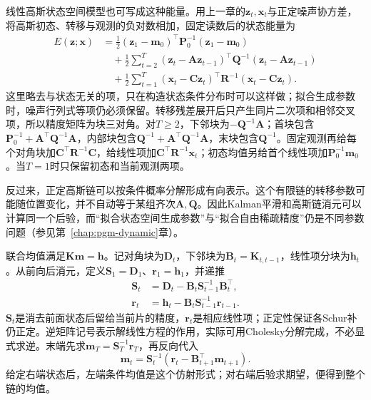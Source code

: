 线性高斯状态空间模型也可写成这种能量。用上一章的$\bm z_t,\bm x_t$与正定噪声协方差，将高斯初态、转移与观测的负对数相加，固定读数后的状态能量为
\begin{equation}
  \begin{aligned}
    E(\bm z;\bm x)
      &=\tfrac12(\bm z_1-\bm m_0)^\top\bm P_0^{-1}
                          (\bm z_1-\bm m_0)\\
      &\quad{}+\tfrac12\sum_{t=2}^{T}
        (\bm z_t-\bm A\bm z_{t-1})^\top\bm Q^{-1}
        (\bm z_t-\bm A\bm z_{t-1})\\
      &\quad{}+\tfrac12\sum_{t=1}^{T}
        (\bm x_t-\bm C\bm z_t)^\top\bm R^{-1}
        (\bm x_t-\bm C\bm z_t).
  \end{aligned}
  \label{eq:pgm-dynamic-undirected-lgssm-energy}
\end{equation}
这里略去与状态无关的项，只在构造状态条件分布时可以这样做；拟合生成参数时，噪声行列式等项仍必须保留。转移残差展开后只产生同片二次项和相邻交叉项，所以精度矩阵为块三对角。对$T\geq2$，下邻块为$-\bm Q^{-1}\bm A$；首块包含$\bm P_0^{-1}+\bm A^\top\bm Q^{-1}\bm A$，内部块包含$\bm Q^{-1}+\bm A^\top\bm Q^{-1}\bm A$，末块包含$\bm Q^{-1}$。固定观测再给每个对角块加$\bm C^\top\bm R^{-1}\bm C$，给线性项加$\bm C^\top\bm R^{-1}\bm x_t$；初态均值另给首个线性项加$\bm P_0^{-1}\bm m_0$。当$T=1$时只保留初态和当前观测两项。

反过来，正定高斯链可以按条件概率分解形成有向表示。这个有限链的转移参数可能随位置变化，并不自动等于某组齐次$\bm A,\bm Q$。因此Kalman平滑和高斯链消元可以计算同一个后验，而“拟合状态空间生成参数”与“拟合自由稀疏精度”仍是不同参数问题（参见第~\ref{chap:pgm-dynamic}章）。

联合均值满足$\bm K\bm m=\bm h$。记对角块为$\bm D_t$，下邻块为$\bm B_t=\bm K_{t,t-1}$，线性项分块为$\bm h_t$。从前向后消元，定义$\bm S_1=\bm D_1$、$\bm r_1=\bm h_1$，并递推
\begin{equation}
  \begin{aligned}
    \bm S_t&=\bm D_t-\bm B_t\bm S_{t-1}^{-1}\bm B_t^\top,\\
    \bm r_t&=\bm h_t-\bm B_t\bm S_{t-1}^{-1}\bm r_{t-1}.
  \end{aligned}
  \label{eq:pgm-dynamic-undirected-gaussian-elimination}
\end{equation}
$\bm S_t$是消去前面状态后留给当前片的精度，$\bm r_t$是相应线性项；正定性保证各Schur补仍正定。逆矩阵记号表示解线性方程的作用，实际可用Cholesky分解完成，不必显式求逆。末端先求$\bm m_T=\bm S_T^{-1}\bm r_T$，再反向代入
\[
  \bm m_t=\bm S_t^{-1}
       (\bm r_t-\bm B_{t+1}^\top\bm m_{t+1}).
\]
给定右端状态后，左端条件均值是这个仿射形式；对右端后验求期望，便得到整个链的均值。

